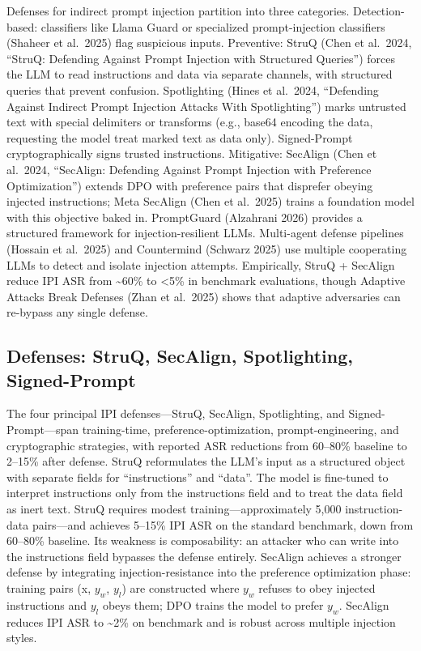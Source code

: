 \documentclass{article}
\begin{document}
Defenses for indirect prompt injection partition into three categories. Detection-based: classifiers like Llama Guard or specialized prompt-injection classifiers (Shaheer et al.~2025) flag suspicious inputs. Preventive: StruQ (Chen et al.~2024, ``StruQ: Defending Against Prompt Injection with Structured Queries'') forces the LLM to read instructions and data via separate channels, with structured queries that prevent confusion. Spotlighting (Hines et al.~2024, ``Defending Against Indirect Prompt Injection Attacks With Spotlighting'') marks untrusted text with special delimiters or transforms (e.g., base64 encoding the data, requesting the model treat marked text as data only). Signed-Prompt \citep{suo2024arxiv2401076122024} cryptographically signs trusted instructions. Mitigative: SecAlign (Chen et al.~2024, ``SecAlign: Defending Against Prompt Injection with Preference Optimization'') extends DPO with preference pairs that disprefer obeying injected instructions; Meta SecAlign (Chen et al.~2025) trains a foundation model with this objective baked in. PromptGuard (Alzahrani 2026) provides a structured framework for injection-resilient LLMs. Multi-agent defense pipelines (Hossain et al.~2025) and Countermind (Schwarz 2025) use multiple cooperating LLMs to detect and isolate injection attempts. Empirically, StruQ + SecAlign reduce IPI ASR from \textasciitilde60\% to \textless5\% in benchmark evaluations, though Adaptive Attacks Break Defenses (Zhan et al.~2025) shows that adaptive adversaries can re-bypass any single defense.

\subsection{Defenses: StruQ, SecAlign, Spotlighting, Signed-Prompt}\label{defenses-struq-secalign-spotlighting-signed-prompt}

The four principal IPI defenses---StruQ, SecAlign, Spotlighting, and Signed-Prompt---span training-time, preference-optimization, prompt-engineering, and cryptographic strategies, with reported ASR reductions from 60--80\% baseline to 2--15\% after defense. StruQ \citep{chen2024arxiv2402063632024} reformulates the LLM's input as a structured object with separate fields for ``instructions'' and ``data''. The model is fine-tuned to interpret instructions only from the instructions field and to treat the data field as inert text. StruQ requires modest training---approximately 5,000 instruction-data pairs---and achieves 5--15\% IPI ASR on the standard benchmark, down from 60--80\% baseline. Its weakness is composability: an attacker who can write into the instructions field bypasses the defense entirely. SecAlign \citep{chen2024arxiv2402063632024} achieves a stronger defense by integrating injection-resistance into the preference optimization phase: training pairs (x, \(y_w\), \(y_l\)) are constructed where \(y_w\) refuses to obey injected instructions and \(y_l\) obeys them; DPO trains the model to prefer \(y_w\). SecAlign reduces IPI ASR to \textasciitilde2\% on benchmark and is robust across multiple injection styles.
\end{document}
